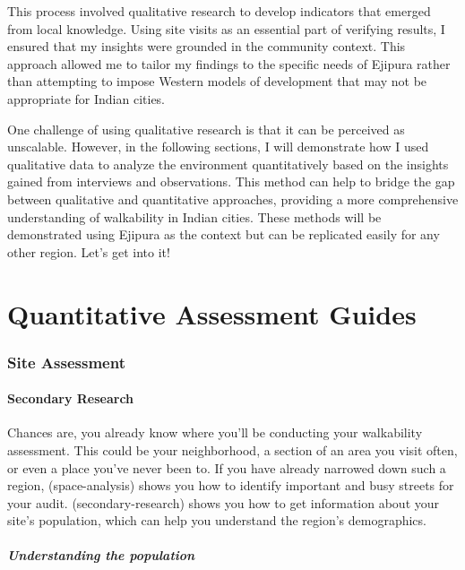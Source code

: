 \documentclass[
]{latex/krantz}
\begin{document}
This process involved qualitative research to develop indicators that emerged from local knowledge. Using site visits as an essential part of verifying results, I ensured that my insights were grounded in the community context. This approach allowed me to tailor my findings to the specific needs of Ejipura rather than attempting to impose Western models of development that may not be appropriate for Indian cities.

One challenge of using qualitative research is that it can be perceived as unscalable. However, in the following sections, I will demonstrate how I used qualitative data to analyze the environment quantitatively based on the insights gained from interviews and observations. This method can help to bridge the gap between qualitative and quantitative approaches, providing a more comprehensive understanding of walkability in Indian cities. These methods will be demonstrated using Ejipura as the context but can be replicated easily for any other region. Let's get into it!

\hypertarget{part-quantitative-assessment-guides}{%
\part{Quantitative Assessment Guides}\label{part-quantitative-assessment-guides}}

\hypertarget{site-assessment}{%
\section{Site Assessment}\label{site-assessment}}

\hypertarget{secondary-research}{%
\subsection{Secondary Research}\label{secondary-research}}

Chances are, you already know where you'll be conducting your walkability assessment. This could be your neighborhood, a section of an area you visit often, or even a place you've never been to. If you have already narrowed down such a region, \textcite{ref}(space-analysis) shows you how to identify important and busy streets for your audit. \textcite{ref}(secondary-research) shows you how to get information about your site's population, which can help you understand the region's demographics.

\hypertarget{understanding-the-population}{%
\subsubsection{Understanding the population}\label{understanding-the-population}}
\end{document}
